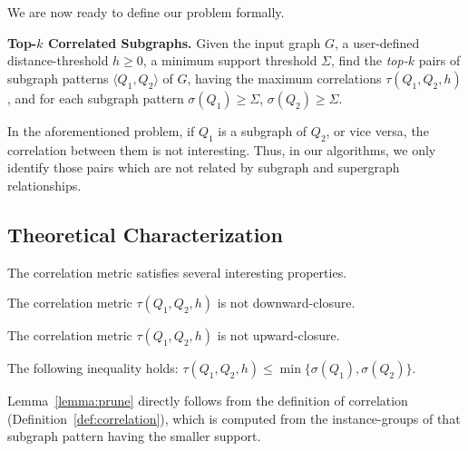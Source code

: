 We are now ready to define our problem formally.

\begin{problem}
\label{prob:top-k}
{\bf {\sf Top-$k$} Correlated Subgraphs.}
Given the input graph $G$, a user-defined distance-threshold $h\ge0$, a minimum support threshold $\Sigma$, find the {\em top-$k$} pairs of subgraph patterns $\langle Q_1, Q_2 \rangle$ of $G$, having the
maximum correlations $\tau(Q_1,Q_2,h)$, and for each subgraph pattern $\sigma(Q_1)\ge \Sigma$, $\sigma(Q_2)\ge \Sigma$.
\end{problem}

In the aforementioned problem, if $Q_1$ is a subgraph of $Q_2$, or vice versa, the correlation between them is not interesting.
Thus, in our algorithms, we only identify those pairs which are not related by subgraph and supergraph relationships.


\subsection{Theoretical Characterization}
\label{sec:characteristics}
 
The correlation metric satisfies several interesting properties.

\begin{lma}
\label{lemma:downward}
The correlation metric $\tau(Q_1,Q_2,h)$ is not downward-closure.
\end{lma}

\begin{lma}
\label{lemma:upward}
The correlation metric $\tau(Q_1,Q_2,h)$ is not upward-closure.
\end{lma}

\begin{lma}
\label{lemma:prune}
The following inequality holds: $\tau(Q_1,Q_2,h) \le \min \{\sigma(Q_1),\sigma(Q_2)\}$.
\end{lma}

Lemma~\ref{lemma:prune} directly follows from the definition of correlation (Definition~\ref{def:correlation}), which is computed
from the instance-groups of that subgraph pattern having the smaller support.